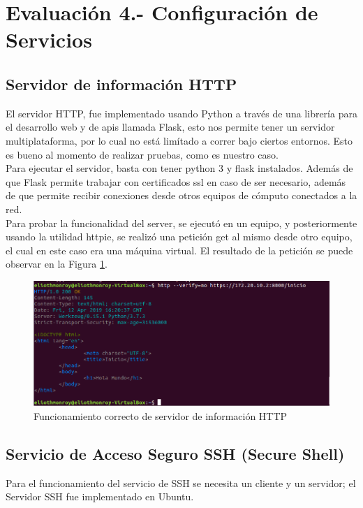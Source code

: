 \section{Evaluación 4.- Configuración de Servicios}
\subsection{Servidor de información HTTP}
\noindent
El servidor HTTP, fue implementado usando Python a través de una librería para el desarrollo web y de apis llamada Flask, esto nos permite tener un servidor multiplataforma, por lo cual no está limítado a correr bajo ciertos entornos. Esto es bueno al momento de realizar pruebas, como es nuestro caso.\\ Para ejecutar el servidor, basta con tener python 3 y flask instalados. Además de que Flask permite trabajar con certificados ssl en caso de ser necesario, además de que permite recibir conexiones desde otros equipos de cómputo conectados a la red.\\ Para probar la funcionalidad del server, se ejecutó en un equipo, y posteriormente usando la utilidad httpie, se realizó una petición get al mismo desde otro equipo, el cual en este caso era una máquina virtual. El resultado de la petición se puede observar en la Figura \ref{fig:http1}.
\begin{figure}[H]
  \centering
    \includegraphics[scale=.54]{imagenes/primero/httpscreenshot.png}
    \caption{Funcionamiento correcto de servidor de información HTTP}
    \label{fig:http1}
\end{figure}
\subsection{Servicio de Acceso Seguro SSH (Secure Shell)}
\noindent
Para el funcionamiento del servicio de SSH se necesita un cliente y un servidor; el Servidor SSH fue implementado en Ubuntu.
